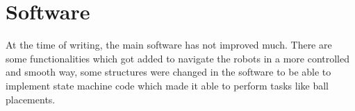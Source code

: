 \section{Software}
\setlength\intextsep{0pt}
At the time of writing, the main software has not improved much. There are some functionalities which got added to navigate the robots in a more controlled and smooth way, some structures were changed in the software to be able to implement state machine code which made it able to perform tasks like ball placements.


%
%
%
%
%
%
%

